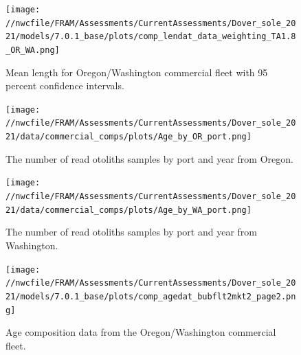 \documentclass[11pt,
  english,
  a4paper,
]{article}
\begin{document}
\begin{figure}
\centering
\texttt{[image: //nwcfile/FRAM/Assessments/CurrentAssessments/Dover\_sole\_2021/models/7.0.1\_base/plots/comp\_lendat\_data\_weighting\_TA1.8\_OR\_WA.png]}
\caption{Mean length for Oregon/Washington commercial fleet with 95 percent confidence intervals.\label{fig:mean-orwa-len-data}}
\end{figure}

\tagmcend\tagstructend


\begin{figure}
\centering
\texttt{[image: //nwcfile/FRAM/Assessments/CurrentAssessments/Dover\_sole\_2021/data/commercial\_comps/plots/Age\_by\_OR\_port.png]}
\caption{The number of read otoliths samples by port and year from Oregon.\label{fig:or-age-port}}
\end{figure}

\tagmcend\tagstructend

\newpage


\begin{figure}
\centering
\texttt{[image: //nwcfile/FRAM/Assessments/CurrentAssessments/Dover\_sole\_2021/data/commercial\_comps/plots/Age\_by\_WA\_port.png]}
\caption{The number of read otoliths samples by port and year from Washington.\label{fig:wa-age-port}}
\end{figure}

\tagmcend\tagstructend


\begin{figure}
\centering
\texttt{[image: //nwcfile/FRAM/Assessments/CurrentAssessments/Dover\_sole\_2021/models/7.0.1\_base/plots/comp\_agedat\_bubflt2mkt2\_page2.png]}
\caption{Age composition data from the Oregon/Washington commercial fleet.\label{fig:orwa-age-data}}
\end{figure}

\tagmcend\tagstructend

\end{document}
